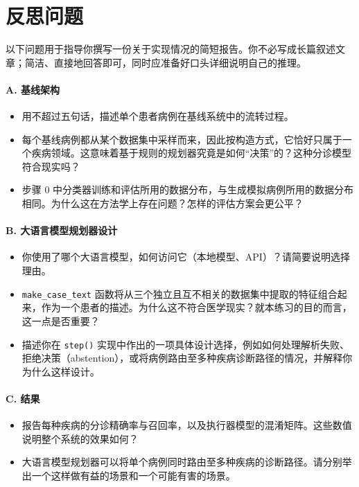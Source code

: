 \section{反思问题}
\label{sec:case3-reflection}

以下问题用于指导你撰写一份关于实现情况的简短报告。你不必写成长篇叙述文章；简洁、直接地回答即可，同时应准备好口头详细说明自己的推理。

\paragraph{A. 基线架构}
\begin{itemize}
    \item 用不超过五句话，描述单个患者病例在基线系统中的流转过程。
    \item 每个基线病例都从某个数据集中采样而来，因此按构造方式，它恰好只属于一个疾病领域。这意味着基于规则的规划器究竟是如何“决策”的？这种分诊模型符合现实吗？
    \item 步骤 0 中分类器训练和评估所用的数据分布，与生成模拟病例所用的数据分布相同。为什么这在方法学上存在问题？怎样的评估方案会更公平？
\end{itemize}

\paragraph{B. 大语言模型规划器设计}
\begin{itemize}
    \item 你使用了哪个大语言模型，如何访问它（本地模型、API）？请简要说明选择理由。
    \item \texttt{make\_case\_text} 函数将从三个独立且互不相关的数据集中提取的特征组合起来，作为一个患者的描述。为什么这不符合医学现实？就本练习的目的而言，这一点是否重要？
    \item 描述你在 \texttt{step()} 实现中作出的一项具体设计选择，例如如何处理解析失败、拒绝决策（abstention），或将病例路由至多种疾病诊断路径的情况，并解释你为什么这样设计。
\end{itemize}

\paragraph{C. 结果}
\begin{itemize}
    \item 报告每种疾病的分诊精确率与召回率，以及执行器模型的混淆矩阵。这些数值说明整个系统的效果如何？
    \item 大语言模型规划器可以将单个病例同时路由至多种疾病的诊断路径。请分别举出一个这样做有益的场景和一个可能有害的场景。
\end{itemize}


